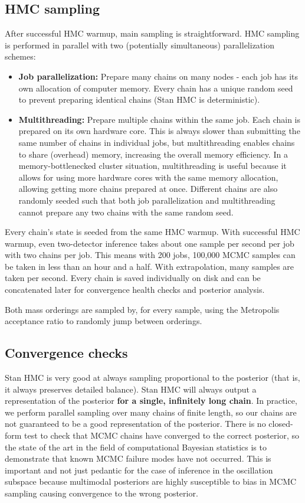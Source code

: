 \documentclass{article}
\begin{document}
\subsection{HMC sampling}
After successful HMC warmup, main sampling is straightforward. HMC sampling is performed in parallel with two (potentially simultaneous) parallelization schemes:
\begin{itemize}
  \item \textbf{Job parallelization:} Prepare many chains on many nodes - each job has its own allocation of computer memory. Every chain has a unique random seed to prevent preparing identical chains (Stan HMC is deterministic).
  \item \textbf{Multithreading:} Prepare multiple chains within the same job. Each chain is prepared on its own hardware core. This is always slower than submitting the same number of chains in individual jobs, but multithreading enables chains to share (overhead) memory, increasing the overall memory efficiency. In a memory-bottlenecked cluster situation, multithreading is useful because it allows for using more hardware cores with the same memory allocation, allowing getting more chains prepared at once. Different chains are also randomly seeded such that both job parallelization and multithreading cannot prepare any two chains with the same random seed.
\end{itemize}
Every chain's state is seeded from the same HMC warmup. With successful HMC warmup, even two-detector inference takes about one sample per second per job with two chains per job. This means with 200 jobs, 100,000 MCMC samples can be taken in less than an hour and a half. With extrapolation, many samples are taken per second. Every chain is saved individually on disk and can be concatenated later for convergence health checks and posterior analysis.

Both mass orderings are sampled by, for every sample, using the Metropolis acceptance ratio to randomly jump between orderings.

\subsection{Convergence checks}
Stan HMC is very good at always sampling proportional to the posterior (that is, it always preserves detailed balance). Stan HMC will always output a representation of the posterior \textbf{for a single, infinitely long chain}. In practice, we perform parallel sampling over many chains of finite length, so our chains are not guaranteed to be a good representation of the posterior. There is no closed-form test to check that MCMC chains have converged to the correct posterior, so the state of the art in the field of computational Bayesian statistics is to demonstrate that known MCMC failure modes have not occurred. This is important and not just pedantic for the case of inference in the oscillation subspace because multimodal posteriors are highly susceptible to bias in MCMC sampling causing convergence to the wrong posterior.
\end{document}
